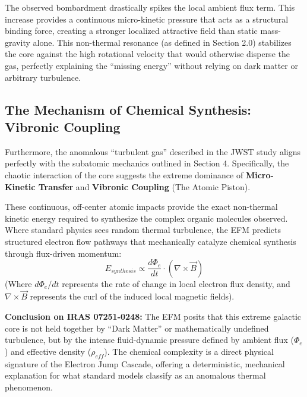 \documentclass[11pt, a4paper]{article}
\begin{document}
The observed bombardment drastically spikes the local ambient flux term. This increase provides a continuous micro-kinetic pressure that acts as a structural binding force, creating a stronger localized attractive field than static mass-gravity alone. This non-thermal resonance (as defined in Section 2.0) stabilizes the core against the high rotational velocity that would otherwise disperse the gas, perfectly explaining the ``missing energy'' without relying on dark matter or arbitrary turbulence.

\subsection{The Mechanism of Chemical Synthesis: Vibronic Coupling}
Furthermore, the anomalous ``turbulent gas'' described in the JWST study aligns perfectly with the subatomic mechanics outlined in Section 4. Specifically, the chaotic interaction of the core suggests the extreme dominance of \textbf{Micro-Kinetic Transfer} and \textbf{Vibronic Coupling} (The Atomic Piston).

These continuous, off-center atomic impacts provide the exact non-thermal kinetic energy required to synthesize the complex organic molecules observed. Where standard physics sees random thermal turbulence, the EFM predicts structured electron flow pathways that mechanically catalyze chemical synthesis through flux-driven momentum:
\begin{equation}
  E_{synthesis} \propto \frac{d\Phi_e}{dt} \cdot (\nabla \times \vec{B})
\end{equation}
(Where $d\Phi_e/dt$ represents the rate of change in local electron flux density, and $\nabla \times \vec{B}$ represents the curl of the induced local magnetic fields).

\textbf{Conclusion on IRAS 07251-0248:}
The EFM posits that this extreme galactic core is not held together by ``Dark Matter'' or mathematically undefined turbulence, but by the intense fluid-dynamic pressure defined by ambient flux ($\Phi_e$) and effective density ($\rho_{eff}$). The chemical complexity is a direct physical signature of the Electron Jump Cascade, offering a deterministic, mechanical explanation for what standard models classify as an anomalous thermal phenomenon.

\clearpage
\end{document}
